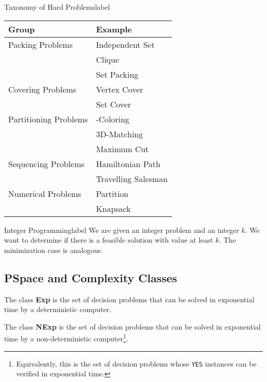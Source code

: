  	\begin{ex}{Taxonomy of Hard Problems}{label}
 		\begin{tabular}{ll}
 		\textbf{Group} & \textbf{Example} \\ \hline
 		Packing Problems
 				& \tabitem Independent Set \\
 				& \tabitem Clique \\
 				& \tabitem Set Packing \\ \hline
			
 		Covering Problems
 				& \tabitem Vertex Cover \\
 				& \tabitem Set Cover \\ \hline

 		Partitioning Problems
 				& \tabitem 3-Coloring \\
 				& \tabitem 3D-Matching \\
 				& \tabitem Maximum Cut \\ \hline

 		Sequencing Problems
 				& \tabitem Hamiltonian Path \\
 				& \tabitem Travelling Salesman \\ \hline

 		Numerical Problems
 				& \tabitem Partition \\
 				& \tabitem Knapsack \\ \hline
		\end{tabular}
 	\end{ex}

 	\begin{ex}{Integer Programming}{label}
 		We are given an integer problem and an integer $k$. We want to determine if there is a feasible solution with value at least $k$. The minimization case is analogous. 
 	\end{ex}

 	\subsection{PSpace and Complexity Classes}
 	\begin{defn}[Exp]
 		The class \textbf{Exp} is the set of decision problems that can be solved in exponential time by a deterministic computer.
 	\end{defn}

 	\begin{defn}[NExp]
 		The class \textbf{NExp} is the set of decision problems that can be solved in exponential time by a non-deterministic computer\footnote{
 		Equivalently, this is the set of decision problems whose \texttt{YES} instances can be verified in exponential time.}.
 	\end{defn}

